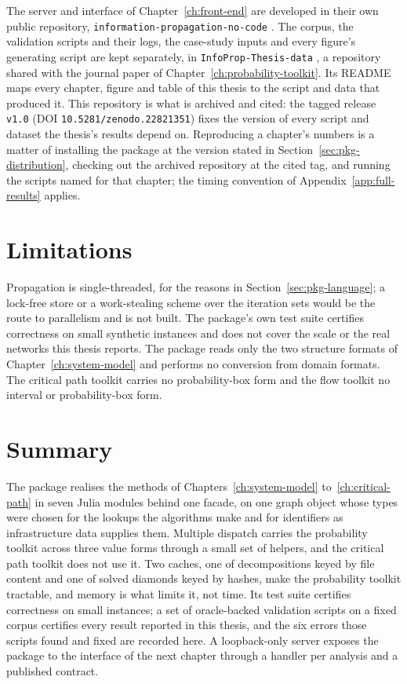 \documentclass[12pt]{report}
\begin{document}
The server and interface of Chapter~\ref{ch:front-end} are developed in their own public
repository, \texttt{information-propagation-no-code} \cite{ipfnocode}. The corpus, the validation scripts and their logs, the
case-study inputs and every figure's generating script are kept separately, in
\texttt{InfoProp-Thesis-data} \cite{thesisdata}, a repository shared with the journal paper of
Chapter~\ref{ch:probability-toolkit}. Its README maps every chapter, figure and table of
this thesis to the script and data that produced it. This repository is what is archived and
cited: the tagged release \texttt{v1.0} (DOI \texttt{10.5281/zenodo.22821351}) fixes the
version of every script and dataset the thesis's results depend on. Reproducing a chapter's numbers is a matter of installing the
package at the version stated in Section~\ref{sec:pkg-distribution}, checking out the
archived repository at the cited tag, and running the scripts named for that chapter; the
timing convention of Appendix~\ref{app:full-results} applies.

\section{Limitations}
\label{sec:pkg-limitations}

Propagation is single-threaded, for the reasons in Section~\ref{sec:pkg-language}; a
lock-free store or a work-stealing scheme over the iteration sets would be the route to
parallelism and is not built. The package's own test suite certifies correctness on small
synthetic instances and does not cover the scale or the real networks this thesis reports.
The package reads only the two structure formats of Chapter~\ref{ch:system-model} and performs
no conversion from domain formats. The critical path toolkit carries no probability-box
form and the flow toolkit no interval or probability-box form.

\section{Summary}
\label{sec:pkg-summary}

The package realises the methods of Chapters~\ref{ch:system-model}
to~\ref{ch:critical-path} in seven Julia modules behind one facade, on one graph object whose
types were chosen for the lookups the algorithms make and for identifiers as infrastructure
data supplies them. Multiple dispatch carries the probability toolkit across three value forms through a small set of helpers, and the critical path toolkit does not use it. Two caches, one of decompositions keyed by file content and one of solved diamonds
keyed by hashes, make the probability toolkit tractable, and memory is what limits it, not
time. Its test suite certifies correctness on small instances; a set of oracle-backed
validation scripts on a fixed corpus certifies every result reported in this thesis, and
the six errors those scripts found and fixed are
recorded here. A loopback-only server exposes the package to the interface of the next
chapter through a handler per analysis and a published contract.

\ifdefined\maindoc
\else
\printbibliography
\end{document}
